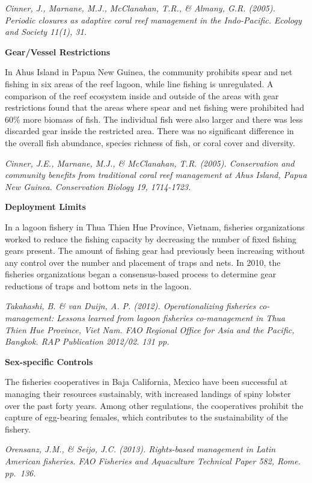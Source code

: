 \documentclass[]{book}
\begin{document}
\emph{Cinner, J., Marnane, M.J., McClanahan, T.R., \& Almany, G.R.
(2005). Periodic closures as adaptive coral reef management in the
Indo-Pacific. Ecology and Society 11(1), 31.}

\textbf{Gear/Vessel Restrictions}

In Ahus Island in Papua New Guinea, the community prohibits spear and
net fishing in six areas of the reef lagoon, while line fishing is
unregulated. A comparison of the reef ecosystem inside and outside of
the areas with gear restrictions found that the areas where spear and
net fishing were prohibited had 60\% more biomass of fish. The
individual fish were also larger and there was less discarded gear
inside the restricted area. There was no significant difference in the
overall fish abundance, species richness of fish, or coral cover and
diversity.

\emph{Cinner, J.E., Marnane, M.J., \& McClanahan, T.R. (2005).
Conservation and community benefits from traditional coral reef
management at Ahus Island, Papua New Guinea. Conservation Biology 19,
1714-1723.}

\textbf{Deployment Limits}

In a lagoon fishery in Thua Thien Hue Province, Vietnam, fisheries
organizations worked to reduce the fishing capacity by decreasing the
number of fixed fishing gears present. The amount of fishing gear had
previously been increasing without any control over the number and
placement of traps and nets. In 2010, the fisheries organizations began
a consensus-based process to determine gear reductions of traps and
bottom nets in the lagoon.

\emph{Takahashi, B. \& van Duijn, A. P. (2012). Operationalizing
fisheries co-management: Lessons learned from lagoon fisheries
co-management in Thua Thien Hue Province, Viet Nam. FAO Regional Office
for Asia and the Pacific, Bangkok. RAP Publication 2012/02. 131 pp.}

\textbf{Sex-specific Controls}

The fisheries cooperatives in Baja California, Mexico have been
successful at managing their resources sustainably, with increased
landings of spiny lobster over the past forty years. Among other
regulations, the cooperatives prohibit the capture of egg-bearing
females, which contributes to the sustainability of the fishery.

\emph{Orensanz, J.M., \& Seijo, J.C. (2013). Rights-based management in
Latin American fisheries. FAO Fisheries and Aquaculture Technical Paper
582, Rome. pp.~136.}
\end{document}
